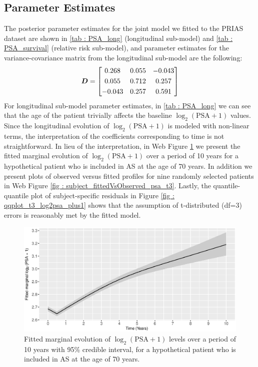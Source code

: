 \subsection{Parameter Estimates}
\label{subsec : param_estimates}
The posterior parameter estimates for the joint model we fitted to the PRIAS dataset are shown in \ref{tab : PSA_long} (longitudinal sub-model) and \ref{tab : PSA_survival} (relative risk sub-model), and parameter estimates for the variance-covariance matrix from the longitudinal sub-model are the following:
\begin{equation*}
\boldsymbol{D} = \begin{bmatrix}
       0.268 & 0.055 & -0.043 \\[0.3em]
       0.055 & 0.712 & 0.257 \\[0.3em]
       -0.043 & 0.257 & 0.591
     \end{bmatrix}
\end{equation*} 
For longitudinal sub-model parameter estimates, in \ref{tab : PSA_long} we can see that the age of the patient trivially affects the baseline $\log_2 (\mbox{PSA} + 1)$ values. Since the longitudinal evolution of $\log_2 (\mbox{PSA} + 1)$ is modeled with non-linear terms, the interpretation of the coefficients corresponding to time is not straightforward. In lieu of the interpretation, in Web Figure \ref{fig : fitted_trend_psa} we present the fitted marginal evolution of $\log_2 (\mbox{PSA} + 1)$ over a period of 10 years for a hypothetical patient who is included in AS at the age of 70 years. In addition we present plots of observed versus fitted profiles for nine randomly selected patients in Web Figure \ref{fig : subject_fittedVsObserved_psa_t3}. Lastly, the quantile-quantile plot of subject-specific residuals in Figure \ref{fig : qqplot_t3_log2psa_plus1} shows that the assumption of t-distributed (df=3) errors is reasonably met by the fitted model.

\begin{figure}[!htb]
\centerline{\includegraphics[width=\columnwidth]{images/model_fit/marginal_fit_log2psaplus1_tdist.eps}}
\caption{Fitted marginal evolution of $\log_2 (\mbox{PSA} + 1)$ levels over a period of 10 years with 95\% credible interval, for a hypothetical patient who is included in AS at the age of 70 years.}
\label{fig : fitted_trend_psa}
\end{figure}

